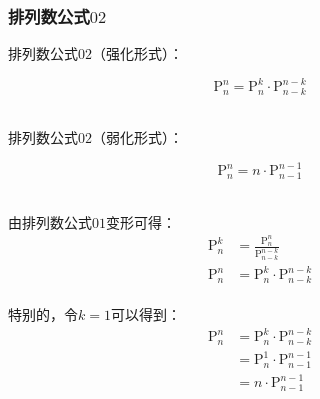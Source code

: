 \documentclass[UTF8]{ctexart}
\begin{document}
\newpage

\subsubsection{排列数公式$02$}
    排列数公式$02$（强化形式）：
    \begin{large}
        \begin{equation*}
            \mathrm{P}_n^n=\mathrm{P}_n^k\cdot\mathrm{P}_{n-k}^{n-k}
        \end{equation*}
    \end{large}\\
    排列数公式$02$（弱化形式）：
    \begin{large}
        \begin{equation*}
            \mathrm{P}_n^n=n\cdot\mathrm{P}_{n-1}^{n-1}
        \end{equation*}
    \end{large}\\
    由排列数公式$01$变形可得：
    \setcounter{equation}{0}
    \begin{align}
        \mathrm{P}_n^k&=\frac{\mathrm{P}_n^n}{\mathrm{P}_{n-k}^{n-k}}\\[3mm]
        \mathrm{P}_n^n&=\mathrm{P}_n^k\cdot\mathrm{P}_{n-k}^{n-k}
    \end{align}\\
    特别的，令$k=1$可以得到：
    \begin{align}
        \mathrm{P}_n^n
        &=\mathrm{P}_n^k\cdot\mathrm{P}_{n-k}^{n-k}\\[3mm]
        &=\mathrm{P}_n^1\cdot\mathrm{P}_{n-1}^{n-1}\\[3mm]
        &=n\cdot\mathrm{P}_{n-1}^{n-1}
    \end{align}

\newpage
\end{document}
